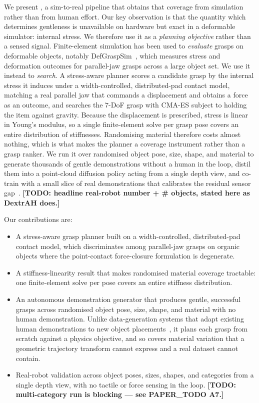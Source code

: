 We present \method, a sim-to-real pipeline that obtains that coverage from simulation rather
than from human effort. Our key observation is that the quantity which determines gentleness
is unavailable on hardware but exact in a deformable simulator: internal stress. We therefore
use it as a \emph{planning objective} rather than a sensed signal. Finite-element simulation
has been used to \emph{evaluate} grasps on deformable objects, notably
DefGraspSim~\cite{defgraspsim}, which measures stress and deformation outcomes for parallel-jaw
grasps across a large object set. We use it instead to \emph{search}. A stress-aware planner
scores a candidate grasp by the internal stress it induces under a width-controlled,
distributed-pad contact model, matching a real parallel jaw that commands a displacement and
obtains a force as an outcome, and searches the $7$-DoF grasp with CMA-ES subject to holding
the item against gravity. Because the displacement is prescribed, stress is linear in Young's
modulus, so a single finite-element solve per grasp pose covers an entire distribution of
stiffnesses. Randomising material therefore costs almost nothing, which is what makes the
planner a coverage instrument rather than a grasp ranker. We run it over randomised object
pose, size, shape, and material to generate thousands of gentle demonstrations without a human
in the loop, distil them into a point-cloud diffusion policy acting from a single depth view,
and co-train with a small slice of real demonstrations that calibrates the residual sensor
gap~\cite{simrealcotrain}.
\textbf{[TODO: headline real-robot number + \# objects, stated here as DextrAH does.]}

\noindent Our contributions are:
\begin{itemize}
  \item A stress-aware grasp planner built on a width-controlled, distributed-pad contact
        model, which discriminates among parallel-jaw grasps on organic objects where the
        point-contact force-closure formulation is degenerate.
  \item A stiffness-linearity result that makes randomised material coverage tractable: one
        finite-element solve per pose covers an entire stiffness distribution.
  \item An autonomous demonstration generator that produces gentle, successful grasps across
        randomised object pose, size, shape, and material with no human demonstration. Unlike
        data-generation systems that adapt existing human demonstrations to new object
        placements~\cite{mandlekar2023mimicgen}, it plans each grasp from scratch against a
        physics objective, and so covers material variation that a geometric trajectory
        transform cannot express and a real dataset cannot contain.
  \item Real-robot validation across object poses, sizes, shapes, and categories from a single
        depth view, with no tactile or force sensing in the loop.
        \textbf{[TODO: multi-category run is blocking --- see PAPER\_TODO A7.]}
\end{itemize}


